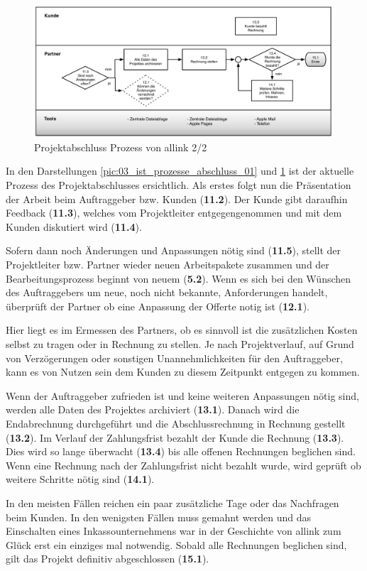\begin{figure}[p]
\begin{center}
\includegraphics[width=0.99\textwidth,angle=0]{./bilder/analyse/03_ist_prozesse_abschluss_02.pdf}
\caption[Projektabschluss Prozess von allink 2/2]{Projektabschluss 
    Prozess von allink 2/2\footnotemark}
\label{pic:03_ist_prozesse_abschluss_02}
\end{center}
\end{figure}

In den Darstellungen \ref{pic:03_ist_prozesse_abschluss_01} und
\ref{pic:03_ist_prozesse_abschluss_02} ist der aktuelle Prozess des Projektabschlusses 
ersichtlich. Als erstes folgt nun die Präsentation der Arbeit beim Auftraggeber 
bzw. Kunden (\textbf{11.2}). Der Kunde gibt daraufhin Feedback (\textbf{11.3}), 
welches vom Projektleiter entgegengenommen und mit dem Kunden diskutiert wird (\textbf{11.4}).

Sofern dann noch Änderungen und Anpassungen nötig sind (\textbf{11.5}), stellt
der Projektleiter bzw. Partner wieder neuen Arbeitspakete zusammen und der
Bearbeitungsprozess beginnt von neuem (\textbf{5.2}). Wenn es sich bei den Wünschen
des Auftraggebers um neue, noch nicht bekannte, Anforderungen handelt, überprüft
der Partner ob eine Anpassung der Offerte notig ist (\textbf{12.1}).

Hier liegt es im Ermessen des Partners, ob es sinnvoll ist die zusätzlichen Kosten 
selbst zu tragen oder in Rechnung zu stellen. Je nach Projektverlauf, auf Grund von
Verzögerungen oder sonstigen Unannehmlichkeiten für den Auftraggeber, kann es
von Nutzen sein dem Kunden zu diesem Zeitpunkt entgegen zu kommen.

Wenn der Auftraggeber zufrieden ist und keine weiteren Anpassungen nötig sind, 
werden alle Daten des Projektes archiviert (\textbf{13.1}). Danach wird die
Endabrechnung durchgeführt und die Abschlussrechnung in Rechnung gestellt (\textbf{13.2}).
Im Verlauf der Zahlungsfrist bezahlt der Kunde die Rechnung (\textbf{13.3}).
Dies wird so lange überwacht (\textbf{13.4}) bis alle offenen Rechnungen beglichen
sind. Wenn eine Rechnung nach der Zahlungsfrist nicht bezahlt wurde, wird
geprüft ob weitere Schritte nötig sind (\textbf{14.1}).

In den meisten Fällen reichen ein paar zusätzliche Tage oder das Nachfragen beim 
Kunden. In den wenigsten Fällen muss gemahnt werden und das Einschalten eines 
Inkassounternehmens war in der Geschichte von allink zum Glück erst ein einziges 
mal notwendig. Sobald alle Rechnungen beglichen sind, gilt das Projekt definitiv 
abgeschlossen (\textbf{15.1}).

\clearpage
